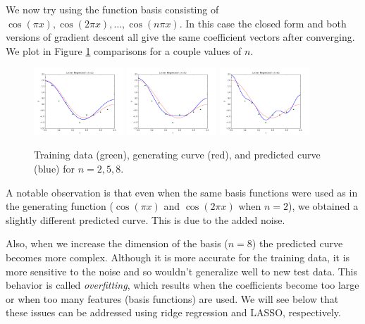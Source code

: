 \documentclass[10pt]{paper}
\begin{document}
We now try using the function basis consisting of $\cos(\pi x), \cos(2 \pi x), \dots, \cos(n \pi x)$. In this case the closed form and both versions of gradient descent all give the same coefficient vectors after converging. We plot in Figure \ref{fig:cos} comparisons for a couple values of $n$.

\begin{figure}[ht!]
  \centering
  \label{fig:cos}
  \includegraphics[width=0.3\textwidth]{../images/cos2.png}
  \includegraphics[width=0.3\textwidth]{../images/cos5.png}
  \includegraphics[width=0.3\textwidth]{../images/cos8.png}
  \caption{Training data (green), generating curve (red), and predicted curve (blue) for $n=2, 5, 8$.}
\end{figure}

A notable observation is that even when the same basis functions were used as in the generating function ($\cos(\pi x)$ and $\cos(2\pi x)$ when $n=2$), we obtained a slightly different predicted curve. This is due to the added noise.

Also, when we increase the dimension of the basis ($n=8$) the predicted curve becomes more complex. Although it is more accurate for the training data, it is more sensitive to the noise and so wouldn't generalize well to new test data. This behavior is called \emph{overfitting}, which results when the coefficients become too large or when too many features (basis functions) are used. We will see below that these issues can be addressed using ridge regression and LASSO, respectively.
\end{document}
